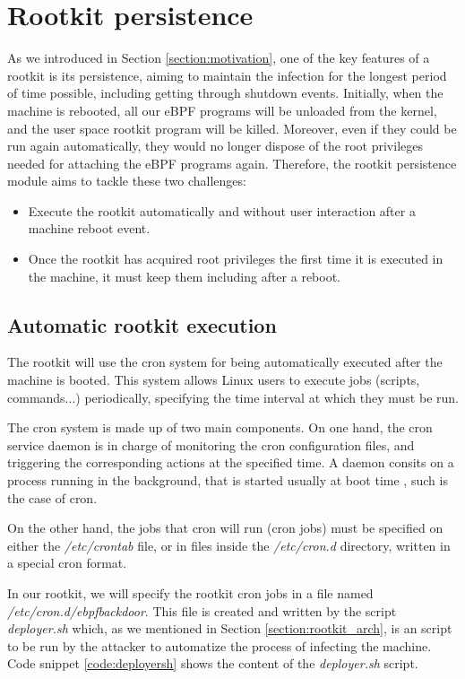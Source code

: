 \section{Rootkit persistence} \label{section:persistence}
As we introduced in Section \ref{section:motivation}, one of the key features of a rootkit is its persistence, aiming to maintain the infection for the longest period of time possible, including getting through shutdown events. Initially, when the machine is rebooted, all our eBPF programs will be unloaded from the kernel, and the user space rootkit program will be killed. Moreover, even if they could be run again automatically, they would no longer dispose of the root privileges needed for attaching the eBPF programs again. Therefore, the rootkit persistence module aims to tackle these two challenges:
\begin{itemize}
\item Execute the rootkit automatically and without user interaction after a machine reboot event.
\item Once the rootkit has acquired root privileges the first time it is executed in the machine, it must keep them including after a reboot.
\end{itemize}

\subsection{Automatic rootkit execution}
The rootkit will use the cron system \cite{cron} for being automatically executed after the machine is booted. This system allows Linux users to execute jobs (scripts, commands...) periodically, specifying the time interval at which they must be run. 

The cron system is made up of two main components. On one hand, the cron service daemon is in charge of monitoring the cron configuration files, and triggering the corresponding actions at the specified time. A daemon consits on a process running in the background, that is started usually at boot time \cite{linux_daemons}, such is the case of cron.

On the other hand, the jobs that cron will run (cron jobs) must be specified on either the \textit{/etc/crontab} file, or in files inside the \textit{/etc/cron.d} directory, written in a special cron format. 

In our rootkit, we will specify the rootkit cron jobs in a file named \textit{/etc/cron.d/ebpfbackdoor}. This file is created and written by the script \textit{deployer.sh} which, as we mentioned in Section \ref{section:rootkit_arch}, is an script to be run by the attacker to automatize the process of infecting the machine. Code snippet \ref{code:deployersh} shows the content of the \textit{deployer.sh} script.

